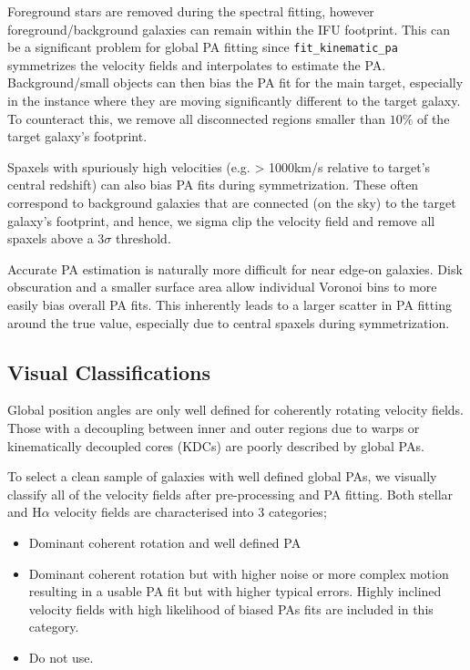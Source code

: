 \documentclass[fleqn,usenatbib]{mnras}
\begin{document}
Foreground stars are removed during the spectral fitting, however foreground/background galaxies can remain within the IFU footprint. This can be a significant problem for global PA fitting since \texttt{fit\_kinematic\_pa} symmetrizes the velocity fields and interpolates to estimate the PA. Background/small objects can then bias the PA fit for the main target, especially in the instance where they are moving significantly different to the target galaxy. To counteract this, we remove all disconnected regions smaller than $10\%$ of the target galaxy's footprint. 

Spaxels with spuriously high velocities (e.g. > 1000km/s relative to target's central redshift) can also bias PA fits during symmetrization. These often correspond to background galaxies that are connected (on the sky) to the target galaxy's footprint, and hence, we sigma clip the velocity field and remove all spaxels above a $3\sigma$ threshold.

Accurate PA estimation is naturally more difficult for near edge-on galaxies. Disk obscuration and a smaller surface area allow individual Voronoi bins to more easily bias overall PA fits. This inherently leads to a larger scatter in PA fitting around the true value, especially due to central spaxels during symmetrization.

\subsection{Visual Classifications} \label{sec:visual_classifications}
Global position angles are only well defined for coherently rotating velocity fields. Those with a decoupling between inner and outer regions due to warps or kinematically decoupled cores (KDCs) are poorly described by global PAs. 

To select a clean sample of galaxies with well defined global PAs, we visually classify all of the velocity fields after pre-processing and PA fitting. Both stellar and H$\alpha$ velocity fields are characterised into 3 categories;
\begin{itemize}
    \item Dominant coherent rotation and well defined PA
    \item Dominant coherent rotation but with higher noise or more complex motion resulting in a usable PA fit but with higher typical errors. Highly inclined velocity fields with high likelihood of biased PAs fits are included in this category. 
    \item Do not use.
\end{itemize}
\end{document}
